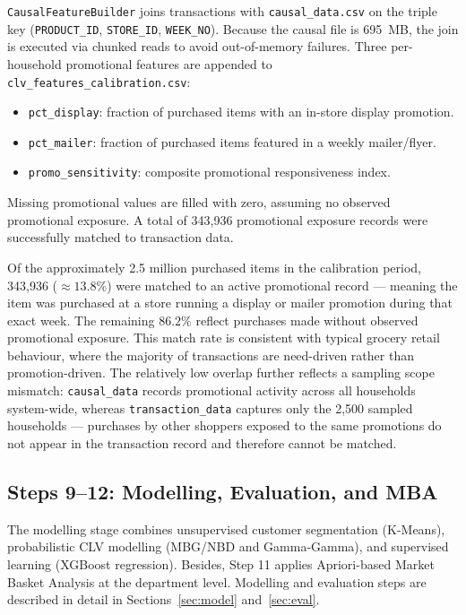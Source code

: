 \documentclass[conference]{IEEEtran}
\begin{document}
\texttt{CausalFeatureBuilder} joins transactions with
\texttt{causal\_data.csv} on the triple key
(\texttt{PRODUCT\_ID}, \texttt{STORE\_ID}, \texttt{WEEK\_NO}).
Because the causal file is 695~MB, the join is executed via
chunked reads to avoid out-of-memory failures. Three per-household
promotional features are appended to
\texttt{clv\_features\_calibration.csv}:

\begin{itemize}
  \item \texttt{pct\_display}: fraction of purchased items with
        an in-store display promotion.
  \item \texttt{pct\_mailer}: fraction of purchased items
        featured in a weekly mailer/flyer.
  \item \texttt{promo\_sensitivity}: composite promotional
        responsiveness index.
\end{itemize}

Missing promotional values are filled with zero,
assuming no observed promotional exposure. A total of 343,936 promotional exposure records were
successfully matched to transaction data.

Of the approximately 2.5 million purchased items in the calibration period, 343{,}936 ($\approx 13.8\%$) were matched to an active promotional record --- meaning the item was purchased at a store running a display or mailer promotion during that exact week. The remaining $86.2\%$ reflect purchases made without observed promotional exposure. This match rate is consistent with typical grocery retail behaviour, where the majority of transactions are need-driven rather than promotion-driven. The relatively low overlap further reflects a sampling scope mismatch: \texttt{causal\_data} records promotional activity across all households system-wide, whereas \texttt{transaction\_data} captures only the 2{,}500 sampled households --- purchases by other shoppers exposed to the same promotions do not appear in the transaction record and therefore cannot be matched.

\subsection{Steps 9--12: Modelling, Evaluation, and MBA}

The modelling stage combines unsupervised customer segmentation (K-Means), probabilistic CLV modelling (MBG/NBD and Gamma-Gamma), and supervised learning (XGBoost regression). Besides, Step 11 applies Apriori-based Market Basket Analysis
at the department level. Modelling and evaluation steps are described in detail in
Sections~\ref{sec:model} and~\ref{sec:eval}.
\end{document}
